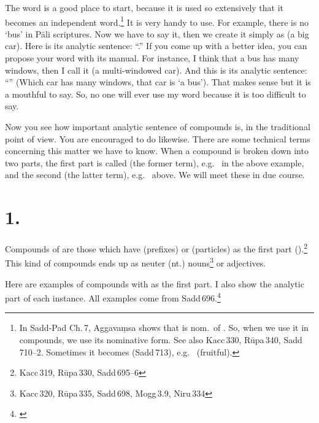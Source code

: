 The word  is a good place to start, because it is used so extensively that it becomes an independent word.\footnote{In Sadd-Pad Ch.\,7, Aggava\d msa shows that  is nom.\ of . So, when we use it in compounds, we use its nominative form. See also Kacc\,330, R\=upa\,340, Sadd\,710--2. Sometimes it becomes  (Sadd\,713), e.g.\  (fruitful).} It is very handy to use. For example, there is no `bus' in P\=ali scriptures. Now we have to say it, then we create it simply as  (a big car). Here is its analytic sentence: ``.'' If you come up with a better idea, you can propose your word with its manual. For instance, I think that a bus has many windows, then I call it  (a multi-windowed car). And this is its analytic sentence: ``'' (Which car has many windows, that car is `a bus'). That makes sense but it is a mouthful to say. So, no one will ever use my word because it is too difficult to say.

Now you see how important analytic sentence of compounds is, in the traditional point of view. You are encouraged to do likewise. There are some technical terms concerning this matter we have to know. When a compound is broken down into two parts, the first part is called  (the former term), e.g.\  in the above example, and the second  (the latter term), e.g.\  above. We will meet these in due course.

\section*{1. }\label{sec:abyayi}

Compounds of  are those which have  (prefixes) or  (particles) as the first part ().\footnote{Kacc\,319, R\=upa\,330, Sadd\,695--6} This kind of compounds ends up as neuter (nt.) nouns\footnote{Kacc\,320, R\=upa\,335, Sadd\,698, Mogg\,3.9, Niru\,334} or adjectives.

Here are examples of compounds with  as the first part. I also show the analytic part of each instance. All examples come from Sadd\,696.\footnote{\citealp[pp.~746--50]{smith:sadd3}}

